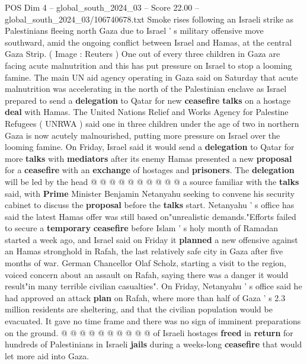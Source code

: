 \begin{textsample}{POS Dim 4 – global\_south\_2024\_03 – Score 22.00 – global\_south\_2024\_03/106740678.txt}  \label{ex:f4_pos_101}
Smoke rises following an Israeli strike as Palestinians fleeing north Gaza due to Israel ' s military offensive move southward, amid the ongoing conflict between Israel and Hamas, at the central Gaza Strip. ( Image : Reuters ) One out of every three children in Gaza are facing acute malnutrition and this has put pressure on Israel to stop a looming famine.
The main UN aid agency operating in Gaza said on Saturday that acute malnutrition was accelerating in the north of the Palestinian enclave as Israel prepared to send a \textbf{delegation} to Qatar for new \textbf{ceasefire} \textbf{talks} on a hostage \textbf{deal} with Hamas.
The United Nations Relief and Works Agency for Palestine Refugees ( UNRWA ) said one in three children under the age of two in northern Gaza is now acutely malnourished, putting more pressure on Israel over the looming famine.
On Friday, Israel said it would send a \textbf{delegation} to Qatar for more \textbf{talks} with \textbf{mediators} after its enemy Hamas presented a new \textbf{proposal} for a \textbf{ceasefire} with an \textbf{exchange} of hostages and \textbf{prisoners}.
The \textbf{delegation} will be led by the head @ @ @ @ @ @ @ @ @ @ a source familiar with the \textbf{talks} said, with \textbf{Prime} Minister Benjamin Netanyahu seeking to convene his security cabinet to discuss the \textbf{proposal} before the \textbf{talks} start.
Netanyahu ' s office has said the latest Hamas offer was still based on"unrealistic demands."Efforts failed to secure a \textbf{temporary} \textbf{ceasefire} before Islam ' s holy month of Ramadan started a week ago, and Israel said on Friday it \textbf{planned} a new offensive against an Hamas stronghold in Rafah, the last relatively safe city in Gaza after five months of war.
German Chancellor Olaf Scholz, starting a visit to the region, voiced concern about an assault on Rafah, saying there was a danger it would result"in many terrible civilian casualties".
On Friday, Netanyahu ' s office said he had approved an attack \textbf{plan} on Rafah, where more than half of Gaza ' s 2.3 million residents are sheltering, and that the civilian population would be evacuated.
It gave no time frame and there was no sign of imminent preparations on the ground. @ @ @ @ @ @ @ @ @ @ of Israeli hostages \textbf{freed} in \textbf{return} for hundreds of Palestinians in Israeli \textbf{jails} during a weeks-long \textbf{ceasefire} that would let more aid into Gaza.

\end{textsample}
